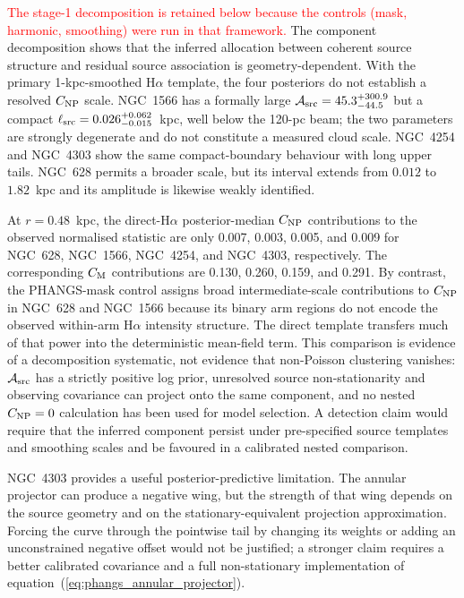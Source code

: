 \documentclass[fleqn,usenatbib]{mnras}
\newcommand{\revadd}[1]{\textcolor{red}{#1}}
\begin{document}
\revadd{The stage-1 decomposition is retained below because the controls (mask, harmonic, smoothing) were run in that framework.}  The component decomposition shows that the inferred allocation between coherent source structure and residual source association is geometry-dependent.  With the primary 1-kpc-smoothed H$\alpha$ template, the four posteriors do not establish a resolved $C_{\rm NP}$ scale.  NGC~1566 has a formally large ${\cal A}_{\rm src}=45.3^{+300.9}_{-44.5}$ but a compact $\ell_{\rm src}=0.026^{+0.062}_{-0.015}$~kpc, well below the 120-pc beam; the two parameters are strongly degenerate and do not constitute a measured cloud scale.  NGC~4254 and NGC~4303 show the same compact-boundary behaviour with long upper tails.  NGC~628 permits a broader scale, but its interval extends from $0.012$ to $1.82$~kpc and its amplitude is likewise weakly identified.

At $r=0.48$~kpc, the direct-H$\alpha$ posterior-median $C_{\rm NP}$ contributions to the observed normalised statistic are only 0.007, 0.003, 0.005, and 0.009 for NGC~628, NGC~1566, NGC~4254, and NGC~4303, respectively.  The corresponding $C_{\rm M}$ contributions are 0.130, 0.260, 0.159, and 0.291.  By contrast, the PHANGS-mask control assigns broad intermediate-scale contributions to $C_{\rm NP}$ in NGC~628 and NGC~1566 because its binary arm regions do not encode the observed within-arm H$\alpha$ intensity structure.  The direct template transfers much of that power into the deterministic mean-field term.  This comparison is evidence of a decomposition systematic, not evidence that non-Poisson clustering vanishes: ${\cal A}_{\rm src}$ has a strictly positive log prior, unresolved source non-stationarity and observing covariance can project onto the same component, and no nested $C_{\rm NP}=0$ calculation has been used for model selection.  A detection claim would require that the inferred component persist under pre-specified source templates and smoothing scales and be favoured in a calibrated nested comparison.

NGC~4303 provides a useful posterior-predictive limitation.  The annular projector can produce a negative wing, but the strength of that wing depends on the source geometry and on the stationary-equivalent projection approximation.  Forcing the curve through the pointwise tail by changing its weights or adding an unconstrained negative offset would not be justified; a stronger claim requires a better calibrated covariance and a full non-stationary implementation of equation~(\ref{eq:phangs_annular_projector}).
\end{document}
